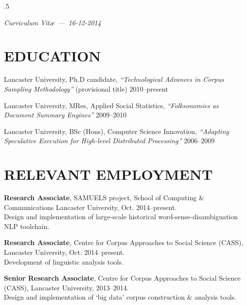 \documentclass{res}
\begin{document}
 
\thispagestyle{empty} %
\address{\\
\texttt{<steve@stephenwattam.com>}\\
\texttt{http://stephenwattam.com/}}


\begin{resume}
\vspace{0.2in}
\moveleft.5\sectionwidth\centerline{\it Curriculum Vit\ae~---~16-12-2014}  

\section{EDUCATION}
\vspace{0.1in} 
 
    Lancaster University, Ph.D candidate,
    \textit{``Technological Advances in Corpus Sampling Methodology''} (provisional title)
    2010--present

    Lancaster University, MRes,
    Applied Social Statistics, 
    \textit{``Folksonomies as Document Summary \mbox{Engines}''}
    2009--2010

    Lancaster University, BSc (Hons),
    Computer Science Innovation, 
    \textit{``Adapting Speculative Execution for High-level Distributed Processing''}
    2006--2009



\section{RELEVANT EMPLOYMENT} 
\vspace{0.1in} 

    
    {\bf Research Associate},
    SAMUELS project, School of Computing \& Communications
    Lancaster University,
    Oct. 2014--present.\\
    Design and implementation of large-scale historical word-sense-disambiguation NLP toolchain.

    
    {\bf Research Associate},
    Centre for Corpus Approaches to Social Science (CASS),
    Lancaster University,
    Oct. 2014--present.\\
    Development of linguistic analysis tools.




    {\bf Senior Research Associate},
    Centre for Corpus Approaches to Social Science (CASS),
    Lancaster University,
    2013--2014.\\
    Design and implementation of `big data' corpus construction \& analysis tools.


\end{resume}
\end{document}
